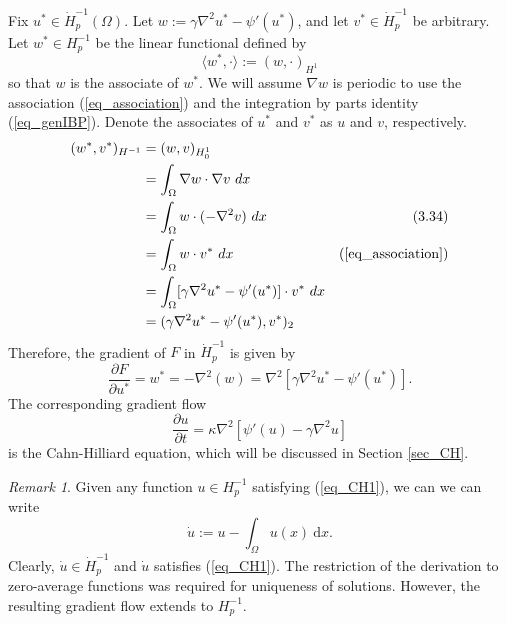 \documentclass[12pt, reqno]{report}
\theoremstyle{definition}
\theoremstyle{remark}
\newtheorem{remark}[theorem]{Remark}
\newcommand{\ud}{\mathrm{d}}
\begin{document}
Fix $u^{*}\in \dot H^{-1}_{p}(\Omega)$. Let 
    $w:=\gamma\nabla ^{2}u^{*}-\psi'(u^{*})$,
and let $v^{*}\in \dot H^{-1}_{p}$ be arbitrary. 
Let $w^{*}\in H^{-1}_{p}$ be the linear functional defined by 
\begin{equation}
    \langle w^*,\cdot\rangle:=(w,\cdot)_{H^1}
\end{equation}
so that $w$ is the associate of $w^*$.
We will assume $\nabla w$ is periodic to use the association (\ref{eq_association}) and the integration by parts identity (\ref{eq_genIBP}). 
Denote the associates of $u^*$ and $v^*$ as $u$ and $v$, respectively.
\begin{align*}
(w^{*},v^{*})_{H^{-1}}&= (w,v)_{H^{1}_{0}}\\
&= \int_{\Omega}\nabla w\cdot \nabla v~dx\\
&= \int_{\Omega}w\cdot(-\nabla ^{2}v)~dx%
&(3.34)\\%
&= \int_{\Omega}w\cdot v^{*}~dx&(\ref{eq_association})\\
&= \int_{\Omega}[\gamma\nabla ^{2}u^{*}-\psi'(u^{*})]\cdot v^{*}~dx\\
&= (\gamma\nabla ^{2}u^*-\psi'(u^{*}),v^{*})_{2}
\end{align*}
Therefore, the gradient of $F$ in $\dot H_{p}^{-1}$ is given by 
\begin{equation} 
    \frac{\partial F}{\partial u^{*}}=w^{*}=-\nabla ^{2}(w)=\nabla ^{2}[\gamma\nabla^2u^*-\psi'(u^{*})].
\end{equation}
The corresponding gradient flow
\begin{equation} \label{eq_CH1}
    \frac{\partial u}{\partial t}=\kappa\nabla^2[\psi'(u )-\gamma\nabla^2u]
\end{equation}
is the Cahn-Hilliard equation, which will be discussed in Section \ref{sec_CH}.

\begin{remark}
    Given any function $u\in H^{-1}_p$ satisfying (\ref{eq_CH1}), we can we can write 
    \begin{equation}
        \dot u:=u-\int_{\Omega}u(x)~\ud x.
    \end{equation}
    Clearly, $\dot u\in\dot H^{-1}_p$ and $\dot u$ satisfies (\ref{eq_CH1}). The restriction of the derivation to zero-average functions was required for uniqueness of solutions. However, the resulting gradient flow extends to $H^{-1}_p$. 
\end{remark}
\end{document}
